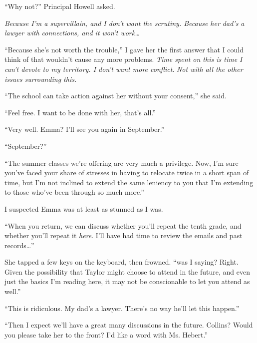``Why not?''  Principal Howell asked.



\emph{Because I'm a supervillain, and I don't want the scrutiny.  Because her dad's a lawyer with connections, and it won't work\ldots}



``Because she's not worth the trouble,'' I gave her the first answer that I could think of that wouldn't cause any more problems.  \emph{Time spent on this is time I can't devote to my territory.  I don't want more conflict}.  \emph{Not with all the other issues surrounding this.}



``The school can take action against her without your consent,'' she said.



``Feel free.  I want to be done with her, that's all.''



``Very well.  Emma?  I'll see you again in September.''



``September?''



``The summer classes we're offering are very much a privilege.  Now, I'm sure you've faced your share of stresses in having to relocate twice in a short span of time, but I'm not inclined to extend the same leniency to you that I'm extending to those who've been through so much more.''



I suspected Emma was at least as stunned as I was.



``When you return, we can discuss whether you'll repeat the tenth grade, and whether you'll repeat it \emph{here}.  I'll have had time to review the emails and past records\ldots''



She tapped a few keys on the keyboard, then frowned.  ``\ldotsWhat was I saying?  Right.  Given the possibility that Taylor might choose to attend in the future, and even just the basics I'm reading here, it may not be conscionable to let you attend as well.''



``This is ridiculous.  My dad's a lawyer.  There's no way he'll let this happen.''



``Then I expect we'll have a great many discussions in the future.  Collins?  Would you please take her to the front?  I'd like a word with Ms. Hebert.''



